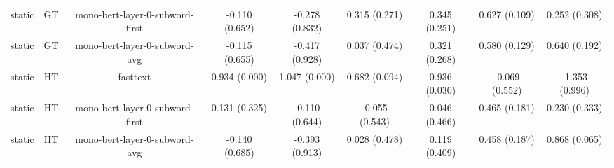 \begin{sidewaystable}[htb]
\begin{tabular}{@{}ccccccccc@{}}
        static & GT & mono-bert-layer-0-subword-first & -0.110 (0.652) & -0.278 (0.832) & 0.315 (0.271) & 0.345 (0.251) & 0.627 (0.109) & 0.252 (0.308) \\
        static & GT & mono-bert-layer-0-subword-avg & -0.115 (0.655) & -0.417 (0.928) & 0.037 (0.474) & 0.321 (0.268) & 0.580 (0.129) & 0.640 (0.192) \\
        static & HT & fasttext & 0.934 (0.000) & 1.047 (0.000) & 0.682 (0.094) & 0.936 (0.030) & -0.069 (0.552) & -1.353 (0.996) \\
        static & HT & mono-bert-layer-0-subword-first & 0.131 (0.325) & -0.110 (0.644) & -0.055 (0.543) & 0.046 (0.466) & 0.465 (0.181) & 0.230 (0.333) \\
        static & HT & mono-bert-layer-0-subword-avg & -0.140 (0.685) & -0.393 (0.913) & 0.028 (0.478) & 0.119 (0.409) & 0.458 (0.187) & 0.868 (0.065) \\
        \bottomrule
    \end{tabular}
\end{sidewaystable}